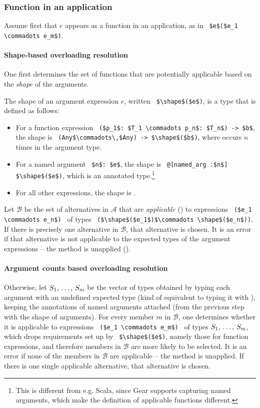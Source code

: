 \subsubsection{Function in an application}

Assume first that $e$ appears as a function in an application, as in ~\lstinline!$e$($e_1 \commadots e_m$)!.

\paragraph{Shape-based overloading resolution}
One first determines the set of functions that are potentially applicable based on the {\em shape} of the arguments. 

The shape of an argument expression $e$, written ~\lstinline!$\shape$($e$)!, is a type that is defined as follows:
\begin{itemize}
\item For a function expression ~\lstinline!($p_1$: $T_1 \commadots p_n$: $T_n$) -> $b$!, the shape is ~\lstinline!(Any$\commadots\,$Any) -> $\shape$($b$)!, where  occurs $n$ times in the argument type. 
\item For a named argument ~\lstinline!$n$: $e$!, the shape is ~\lstinline!@[named_arg :$n$] $\shape$($e$)!, which is an annotated type.\footnote{This is different from e.g. Scala, since Gear supports capturing named arguments, which make the definition of applicable functions different.} %
\item For all other expressions, the shape is . 
\end{itemize}

Let $\mathcal{B}$ be the set of alternatives in $\mathcal{A}$ that are {\em applicable} () to expressions ~\lstinline!($e_1 \commadots e_n$)!~ of types ~\lstinline!($\shape$($e_1$)$\commadots \shape$($e_n$))!. If there is precisely one alternative in $\mathcal{B}$, that alternative is chosen. It is an error if that alternative is not applicable to the expected types of the argument expressions -- the method is unapplied (). 

\paragraph{Argument counts based overloading resolution}
Otherwise, let $S_1 ,\, \ldots ,\, S_m$ be the vector of types obtained by typing each argument with an undefined expected type (kind of equivalent to typing it with ), keeping the annotations of named arguments attached (from the previous step with the shape of arguments). For every member $m$ in $\mathcal{B}$, one determines whether it is applicable to expressions ~\lstinline!($e_1 \commadots e_m$)!~ of types $S_1 ,\, \ldots ,\, S_m$, which drops requirements set up by ~\lstinline!$\shape$($e$)!, namely those for function expressions, and therefore members in $\mathcal{B}$ are more likely to be selected. It is an error if none of the members in $\mathcal{B}$ are applicable -- the method is unapplied. If there is one single applicable alternative, that alternative is chosen. 

